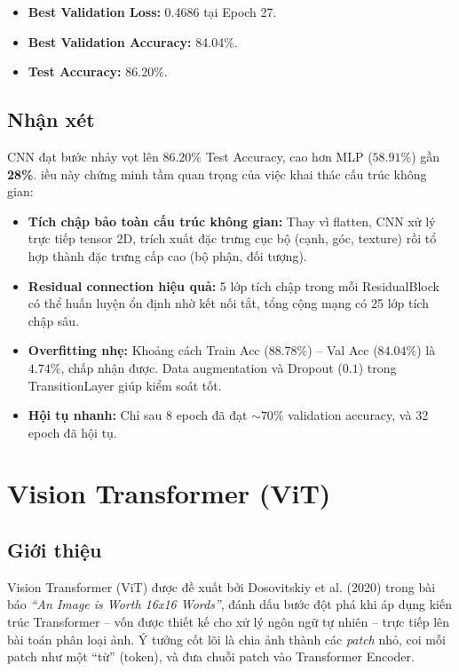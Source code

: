 \documentclass[a4paper]{article}
\theoremstyle{definition}
\begin{document}
\begin{itemize}
	\item \textbf{Best Validation Loss:} 0.4686 tại Epoch 27.
	\item \textbf{Best Validation Accuracy:} 84.04\%.
	\item \textbf{Test Accuracy:} $\mathbf{86.20\%}$.
\end{itemize}

\subsection{Nhận xét}
CNN đạt bước nhảy vọt lên $86.20\%$ Test Accuracy, cao hơn MLP ($58.91\%$) gần \textbf{28\%}. \DJ iều này chứng minh tầm quan trọng của việc khai thác cấu trúc không gian:

\begin{itemize}
	\item \textbf{Tích chập bảo toàn cấu trúc không gian:} Thay vì flatten, CNN xử lý trực tiếp tensor 2D, trích xuất đặc trưng cục bộ (cạnh, góc, texture) rồi tổ hợp thành đặc trưng cấp cao (bộ phận, đối tượng).
	\item \textbf{Residual connection hiệu quả:} 5 lớp tích chập trong mỗi ResidualBlock có thể huấn luyện ổn định nhờ kết nối tắt, tổng cộng mạng có 25 lớp tích chập sâu.
	\item \textbf{Overfitting nhẹ:} Khoảng cách Train Acc ($88.78\%$) -- Val Acc ($84.04\%$) là $4.74\%$, chấp nhận được. Data augmentation và Dropout ($0.1$) trong TransitionLayer giúp kiểm soát tốt.
	\item \textbf{Hội tụ nhanh:} Chỉ sau 8 epoch đã đạt $\sim 70\%$ validation accuracy, và 32 epoch đã hội tụ.
\end{itemize}

\section{Vision Transformer (ViT)}

\subsection{Giới thiệu}
Vision Transformer (ViT) được đề xuất bởi Dosovitskiy et al. (2020) \cite{dosovitskiy2020image} trong bài báo \textit{``An Image is Worth 16x16 Words''}, đánh dấu bước đột phá khi áp dụng kiến trúc Transformer -- vốn được thiết kế cho xử lý ngôn ngữ tự nhiên -- trực tiếp lên bài toán phân loại ảnh. Ý tưởng cốt lõi là chia ảnh thành các \textit{patch} nhỏ, coi mỗi patch như một ``từ'' (token), và đưa chuỗi patch vào Transformer Encoder.
\end{document}
